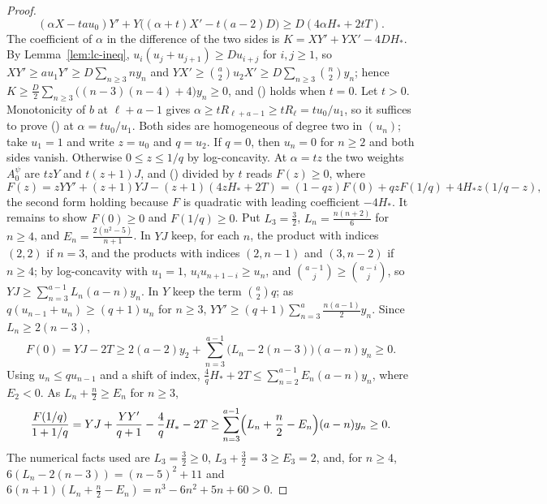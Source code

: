 \documentclass[twoside,10pt]{article}
\numberwithin{equation}{section}
\theoremstyle{slbody}
\theoremstyle{definition}
\theoremstyle{remark}
\renewcommand{\eqref}[1]{\textup{{\normalfont(\oldstylenums{\ref{#1}}}\normalfont)}}
\begin{document}
\begin{proof}
\begin{equation}\label{eq:affine-red}
(\alpha X-tau_0)Y'+Y\bigl((\alpha+t)X'-t(a-2)D\bigr)\geq D(4\alpha H_*+2tT).
\end{equation}
The coefficient of $\alpha$ in the difference of the two sides is $K=XY'+YX'-4DH_*$. By Lemma~\ref{lem:lc-ineq}, $u_i(u_j+u_{j+1})\geq Du_{i+j}$ for $i,j\geq1$, so $XY'\geq au_1Y'\geq D\sum_{n\geq3}ny_n$ and $YX'\geq\binom a2u_2X'\geq D\sum_{n\geq3}\binom n2y_n$; hence $K\geq\frac D2\sum_{n\geq3}\bigl((n-3)(n-4)+4\bigr)y_n\geq0$, and \eqref{eq:affine-red} holds when $t=0$. Let $t>0$. Monotonicity of $b$ at $\ell+a-1$ gives $\alpha\geq tR_{\ell+a-1}\geq tR_\ell=tu_0/u_1$, so it suffices to prove \eqref{eq:affine-red} at $\alpha=tu_0/u_1$. Both sides are homogeneous of degree two in $(u_n)$; take $u_1=1$ and write $z=u_0$ and $q=u_2$. If $q=0$, then $u_n=0$ for $n\geq2$ and both sides vanish. Otherwise $0\leq z\leq1/q$ by log-concavity. At $\alpha=tz$ the two weights $A^\psi_0$ are $tzY$ and $t(z+1)J$, and \eqref{eq:affine-red} divided by $t$ reads $F(z)\geq0$, where
\[
F(z)=zYY'+(z+1)YJ-(z+1)(4zH_*+2T)=(1-qz)F(0)+qzF(1/q)+4H_*z(1/q-z),
\]
the second form holding because $F$ is quadratic with leading coefficient $-4H_*$. It remains to show $F(0)\geq0$ and $F(1/q)\geq0$. Put $L_3=\frac32$, $L_n=\frac{n(n+2)}6$ for $n\geq4$, and $E_n=\frac{2(n^2-5)}{n+1}$. In $YJ$ keep, for each $n$, the product with indices $(2,2)$ if $n=3$, and the products with indices $(2,n-1)$ and $(3,n-2)$ if $n\geq4$; by log-concavity with $u_1=1$, $u_iu_{n+1-i}\geq u_n$, and $\binom{a-1}j\geq\binom{a-i}j$, so $YJ\geq\sum_{n=3}^{a-1}L_n(a-n)y_n$. In $Y$ keep the term $\binom a2q$; as $q(u_{n-1}+u_n)\geq(q+1)u_n$ for $n\geq3$, $YY'\geq(q+1)\sum_{n=3}^a\frac{n(a-1)}2y_n$. Since $L_n\geq2(n-3)$,
\[
F(0)=YJ-2T\geq2(a-2)y_2+\sum_{n=3}^{a-1}\bigl(L_n-2(n-3)\bigr)(a-n)y_n\geq0.
\]
Using $u_n\leq qu_{n-1}$ and a shift of index, $\frac4qH_*+2T\leq\sum_{n=2}^{a-1}E_n(a-n)y_n$, where $E_2<0$. As $L_n+\frac n2\geq E_n$ for $n\geq3$,
\[
\frac{F(1/q)}{1+1/q}=YJ+\frac{YY'}{q+1}-\frac4qH_*-2T\geq\sum_{n=3}^{a-1}\Bigl(L_n+\frac n2-E_n\Bigr)(a-n)y_n\geq0.
\]
The numerical facts used are $L_3=\frac32\geq0$, $L_3+\frac32=3\geq E_3=2$, and, for $n\geq4$, $6(L_n-2(n-3))=(n-5)^2+11$ and $6(n+1)(L_n+\frac n2-E_n)=n^3-6n^2+5n+60>0$.


\end{proof}
\end{document}
